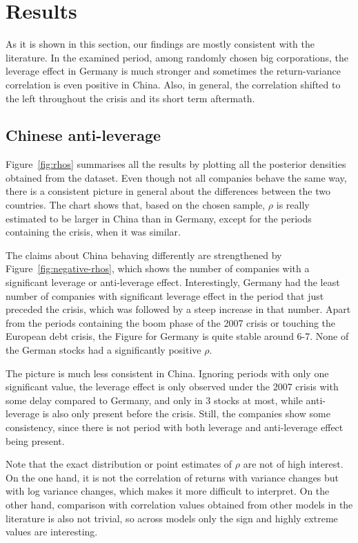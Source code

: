 \section{Results}

As it is shown in this section, our findings are mostly consistent with the literature.
In the examined period, among randomly chosen big corporations, the leverage effect in Germany is much stronger and sometimes the return-variance correlation is even positive in China.
Also, in general, the correlation shifted to the left throughout the crisis and its short term aftermath.

\subsection{Chinese anti-leverage}

Figure~\ref{fig:rhos} summarises all the results by plotting all the posterior densities obtained from the dataset.
Even though not all companies behave the same way, there is a consistent picture in general about the differences between the two countries.
The chart shows that, based on the chosen sample, $\rho$ is really estimated to be larger in China than in Germany, except for the periods containing the crisis, when it was similar.

The claims about China behaving differently are strengthened by Figure~\ref{fig:negative-rhos}, which shows the number of companies with a significant leverage or anti-leverage effect.
Interestingly, Germany had the least number of companies with significant leverage effect in the period that just preceded the crisis, which was followed by a steep increase in that number.
Apart from the periods containing the boom phase of the 2007 crisis or touching the European debt crisis, the Figure for Germany is quite stable around 6-7.
None of the German stocks had a significantly positive $\rho$.

The picture is much less consistent in China.
Ignoring periods with only one significant value, the leverage effect is only observed under the 2007 crisis with some delay compared to Germany, and only in 3 stocks at most, while anti-leverage is also only present before the crisis.
Still, the companies show some consistency, since there is not period with both leverage and anti-leverage effect being present.

Note that the exact distribution or point estimates of $\rho$ are not of high interest.
On the one hand, it is not the correlation of returns with variance changes but with log variance changes, which makes it more difficult to interpret.
On the other hand, comparison with correlation values obtained from other models in the literature is also not trivial, so across models only the sign and highly extreme values are interesting.

